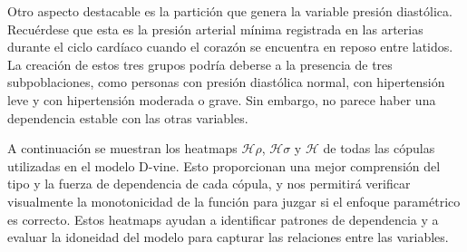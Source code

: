 Otro aspecto destacable es la partición que genera la variable presión diastólica. Recuérdese que esta es la presión arterial mínima registrada en las arterias durante el ciclo cardíaco cuando el corazón se encuentra en reposo entre latidos. La creación de estos tres grupos podría deberse a la presencia de tres subpoblaciones, como personas con presión diastólica normal, con hipertensión leve y con hipertensión moderada o grave. Sin embargo, no parece haber una dependencia estable con las otras variables.

A continuación se muestran los heatmaps $\mathscr{H}\rho$, $\mathscr{H}\sigma$ y $\mathscr{H}$ de todas las cópulas utilizadas en el modelo D-vine. Esto proporcionan una mejor comprensión del tipo y la fuerza de dependencia de cada cópula, y nos permitirá verificar visualmente la monotonicidad de la función para juzgar si el enfoque paramétrico es correcto. Estos heatmaps ayudan a identificar patrones de dependencia y a evaluar la idoneidad del modelo para capturar las relaciones entre las variables.



\begin{figure}[H]
 \centering
\end{figure}

